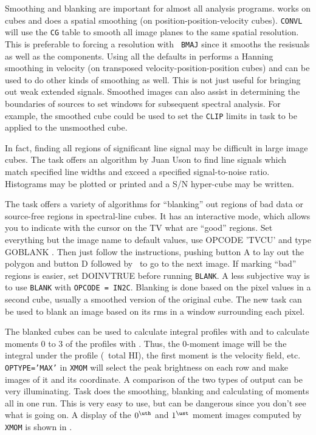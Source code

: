     Smoothing and blanking are important for almost all analysis
programs.  {\tt {}} works on cubes and does a spatial
smoothing (on position-position-velocity cubes).  {\tt CONVL} will use
the {\tt CG} table to smooth all image planes to the same spatial
resolution.  This is preferable to forcing a resolution with {\tt
BMAJ} since it smooths the resisuals as well as the components.  Using
all the defaults in {\tt {}} performs a Hanning smoothing in
velocity (on transposed velocity-position-position cubes) and can be
used to do other kinds of smoothing as well.  This is not just useful
for bringing out weak extended signals.  Smoothed images can also
assist in determining the boundaries of sources to set windows for
subsequent spectral analysis. For example, the smoothed cube could be
used to set the {\tt CLIP} limits in task {\tt {}} to be
applied to the unsmoothed cube.

     In fact, finding all regions of significant line signal may be
difficult in large image cubes.  The task {\tt {}} offers an
algorithm by Juan Uson to find line signals which match specified line
widths and exceed a specified signal-to-noise ratio.  Histograms may
be plotted or printed and a S/N hyper-cube may be written.

    The task {\tt {}} offers a variety of algorithms for
``blanking'' out regions of bad data or source-free regions in
spectral-line cubes.  It has an interactive mode, which allows you to
indicate with the cursor on the TV what are ``good'' regions.  Set
everything but the image name to default values, use {\us OPCODE\qs
'TVCU' \CR} and type {\us GO\qs BLANK \CR}\@.  Then just follow the
instructions, pushing button A to lay out the polygon and button D
followed by \CR\ to go to the next image.  If marking ``bad'' regions
is easier, set {\us DOINV\qs TRUE \CR} before running {\tt BLANK}\@.
A less subjective way is to use {\tt BLANK} with {\tt OPCODE =
IN2C}\@.  Blanking is done based on the pixel values in a second cube,
usually a smoothed version of the original cube.
  The new task {\tt {}} can be used to
blank an image based on its rms in a window surrounding each pixel.

    The blanked cubes can be used to calculate integral profiles with
{\tt {}} and to calculate moments 0 to 3 of the profiles
with {\tt {}}\@. Thus, the 0-moment image will be the
integral under the profile (\eg\ total HI), the first moment is the
velocity field, etc.  {\tt OPTYPE='MAX'} in {\tt XMOM} will select the
peak brightness on each row and make images of it and its coordinate.
A comparison of the two types of output can be very illuminating.
Task {\tt {}} does the smoothing, blanking and calculating
of moments all in one run.  This is very easy to use, but can be
dangerous since you don't see what is going on.  A display of the
$0^{\uth}$ and $1^{\ust}$ moment images computed by {\tt XMOM} is
shown in .

